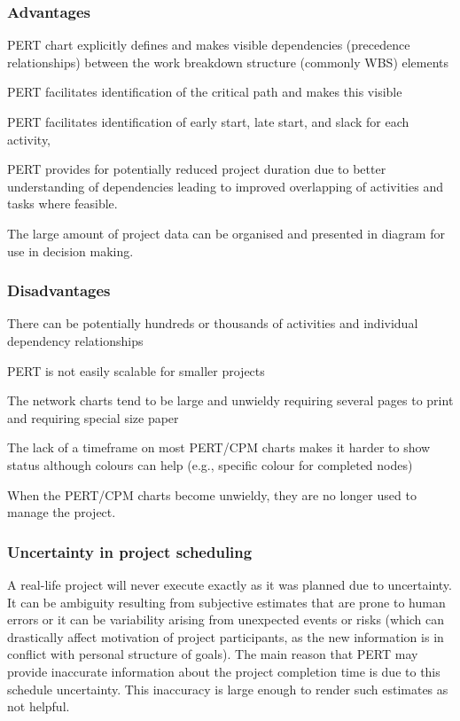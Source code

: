 \subsubsection{Advantages}
\begin{compactitem}
\item PERT chart explicitly defines and makes visible dependencies (precedence relationships) between the work breakdown structure (commonly WBS) elements
\item PERT facilitates identification of the critical path and makes this visible
\item PERT facilitates identification of early start, late start, and slack for each activity,
\item PERT provides for potentially reduced project duration due to better understanding of dependencies leading to improved overlapping of activities and tasks where feasible.
\item The large amount of project data can be organised and presented in diagram for use in decision making.
\end{compactitem}

\subsubsection{Disadvantages}
\begin{compactitem}
\item There can be potentially hundreds or thousands of activities and individual dependency relationships
\item PERT is not easily scalable for smaller projects
\item The network charts tend to be large and unwieldy requiring several pages to print and requiring special size paper
\item The lack of a timeframe on most PERT/CPM charts makes it harder to show status although colours can help (e.g., specific colour for completed nodes)
\item When the PERT/CPM charts become unwieldy, they are no longer used to manage the project.
\end{compactitem}

\subsubsection{Uncertainty in project scheduling}

A real-life project will never execute exactly as it was planned due to uncertainty. It can be ambiguity resulting from subjective estimates that are prone to human errors or it can be variability arising from unexpected events or risks (which can drastically affect motivation of project participants, as the new information is in conflict with personal structure of goals). The main reason that PERT may provide inaccurate information about the project completion time is due to this schedule uncertainty. This inaccuracy is large enough to render such estimates as not helpful.

